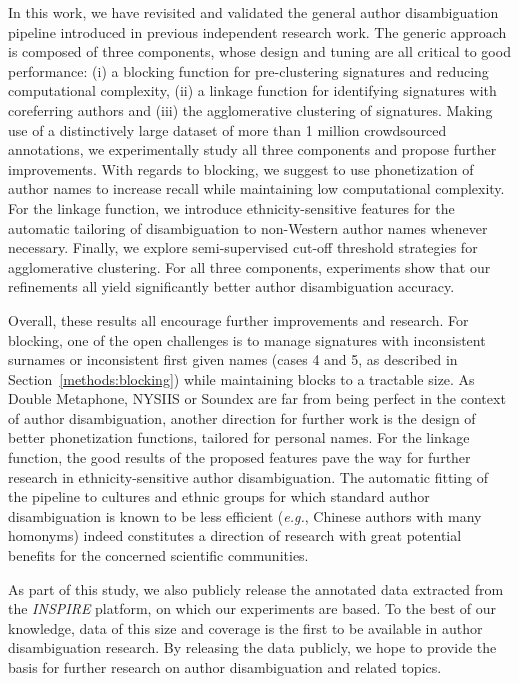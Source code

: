 \documentclass{article}
\newcommand{\glnote}[1]{\textcolor{red}{[GL: #1]}}
\newcommand{\eg}{\emph{e.g.}\xspace}
\begin{document}
In this work, we have revisited and validated the general author disambiguation
pipeline introduced in previous independent research work.
The generic approach is composed of three components, whose design and tuning are all critical
to good performance: (i) a blocking function for pre-clustering signatures
and reducing computational complexity, (ii) a linkage function for identifying
signatures with coreferring authors and (iii) the agglomerative clustering of
signatures. Making use of a distinctively large dataset of more than 1 million
crowdsourced annotations, we experimentally study all three components and
propose further improvements. With regards to blocking, we suggest to use
phonetization of author names to increase recall while maintaining low
computational complexity. For the linkage function, we introduce
ethnicity-sensitive features for the automatic tailoring of disambiguation to non-Western
author names whenever necessary. Finally, we explore semi-supervised cut-off
threshold strategies for agglomerative clustering. For all three components,
experiments show that our refinements all yield significantly better author
disambiguation accuracy.

Overall, these results all encourage further improvements and research. For
blocking, one of the open challenges is to manage signatures with inconsistent
surnames or inconsistent first given names (cases 4 and 5, as described in
Section~\ref{methods:blocking}) while maintaining blocks to a tractable size.
As Double Metaphone, NYSIIS or Soundex are far from being perfect in the
context of author disambiguation, another direction  for further work is the design of better
phonetization functions, tailored for personal names. For the linkage function,
the good results of the proposed features pave the way for further research  in
ethnicity-sensitive author disambiguation. The automatic fitting of the
pipeline to cultures and ethnic groups for which standard author disambiguation
is known to be less efficient (\eg, Chinese authors with many homonyms)  indeed
constitutes a direction of research with great potential benefits for the
concerned scientific communities.

As part of this study, we also publicly release the annotated data extracted
from the \emph{INSPIRE} platform, on which our experiments are based.
To the best of our knowledge, data of this size and coverage is the first to be
available in author disambiguation research. By releasing the data publicly,
we hope to provide the basis for further research on author disambiguation
and related topics.








\end{document}

